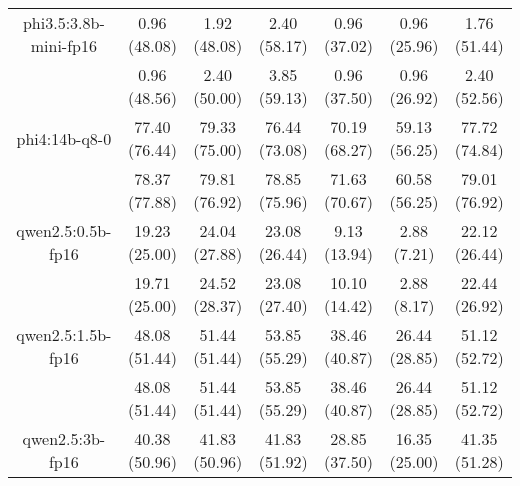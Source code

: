 \begin{table}[]
{\begin{tabular}{ccccccc}
        \multicolumn{1}{c|}{phi3.5:3.8b-mini-fp16} & 0.96 (48.08) & 1.92 (48.08) & \multicolumn{1}{c|}{2.40 (58.17)} & 0.96 (37.02) & \multicolumn{1}{c|}{0.96 (25.96)} & 1.76 (51.44) \\
        
        

        \multicolumn{1}{c|}{} & 0.96 (48.56) & 2.40 (50.00) & \multicolumn{1}{c|}{3.85 (59.13)} & 0.96 (37.50) & \multicolumn{1}{c|}{0.96 (26.92)} & 2.40 (52.56) \\
        \cline{1-7}
        

        \multicolumn{1}{c|}{phi4:14b-q8-0} & 77.40 (76.44) & 79.33 (75.00) & \multicolumn{1}{c|}{76.44 (73.08)} & 70.19 (68.27) & \multicolumn{1}{c|}{59.13 (56.25)} & 77.72 (74.84) \\
        
        

        \multicolumn{1}{c|}{} & 78.37 (77.88) & 79.81 (76.92) & \multicolumn{1}{c|}{78.85 (75.96)} & 71.63 (70.67) & \multicolumn{1}{c|}{60.58 (56.25)} & 79.01 (76.92) \\
        \cline{1-7}
        

        \multicolumn{1}{c|}{qwen2.5:0.5b-fp16} & 19.23 (25.00) & 24.04 (27.88) & \multicolumn{1}{c|}{23.08 (26.44)} & 9.13 (13.94) & \multicolumn{1}{c|}{2.88 (7.21)} & 22.12 (26.44) \\
        
        

        \multicolumn{1}{c|}{} & 19.71 (25.00) & 24.52 (28.37) & \multicolumn{1}{c|}{23.08 (27.40)} & 10.10 (14.42) & \multicolumn{1}{c|}{2.88 (8.17)} & 22.44 (26.92) \\
        \cline{1-7}
        

        \multicolumn{1}{c|}{qwen2.5:1.5b-fp16} & 48.08 (51.44) & 51.44 (51.44) & \multicolumn{1}{c|}{53.85 (55.29)} & 38.46 (40.87) & \multicolumn{1}{c|}{26.44 (28.85)} & 51.12 (52.72) \\
        
        

        \multicolumn{1}{c|}{} & 48.08 (51.44) & 51.44 (51.44) & \multicolumn{1}{c|}{53.85 (55.29)} & 38.46 (40.87) & \multicolumn{1}{c|}{26.44 (28.85)} & 51.12 (52.72) \\
        \cline{1-7}
        

        \multicolumn{1}{c|}{qwen2.5:3b-fp16} & 40.38 (50.96) & 41.83 (50.96) & \multicolumn{1}{c|}{41.83 (51.92)} & 28.85 (37.50) & \multicolumn{1}{c|}{16.35 (25.00)} & 41.35 (51.28) \\
        

\end{tabular}}
\end{table}

